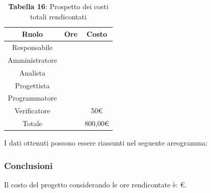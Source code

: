 \begin{table}[H]
	\centering
	\renewcommand{\arraystretch}{1.5}
	\begin{tabular}{|c|c|c|}
		\hline
		\rowcolor{lighter-grayer}
		Ruolo & Ore & Costo \\
		\hline
		Responsabile &  &  \\
		\hline
		Amministratore &  &  \\
		\hline
		Analista &  &  \\
		\hline
		Progettista&  &  \\
		\hline
		Programmatore &  &  \\
		\hline
		Verificatore &  & 50\euro \\
		\hline
		Totale &  &  800,00\euro \\
		\hline
	\end{tabular}
	\caption*{\textbf{Tabella 16}: Prospetto dei costi totali rendicontati \\}
\end{table}

I dati ottenuti possono essere riassunti nel seguente areogramma:


\begin{figure}[!h]
	\centering
\end{figure}

\subsubsection{Conclusioni}
Il costo del progetto considerando le ore rendicontate è: \euro.